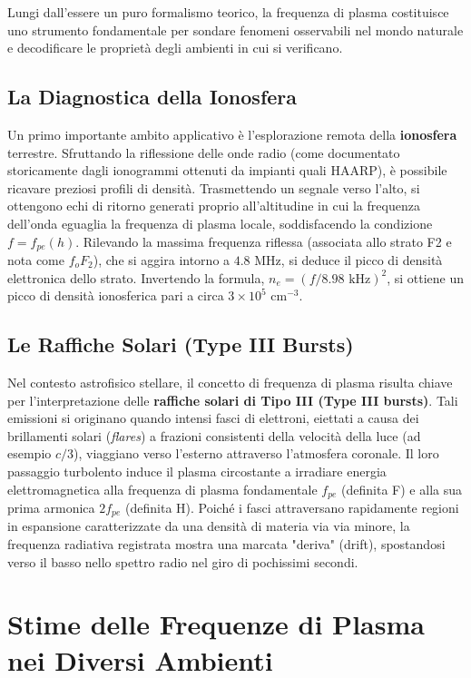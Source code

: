 Lungi dall'essere un puro formalismo teorico, la frequenza di plasma costituisce uno strumento fondamentale per sondare fenomeni osservabili nel mondo naturale e decodificare le proprietà degli ambienti in cui si verificano.

\subsection{La Diagnostica della Ionosfera}
Un primo importante ambito applicativo è l'esplorazione remota della \textbf{ionosfera} terrestre. Sfruttando la riflessione delle onde radio (come documentato storicamente dagli ionogrammi ottenuti da impianti quali HAARP), è possibile ricavare preziosi profili di densità. Trasmettendo un segnale verso l'alto, si ottengono echi di ritorno generati proprio all'altitudine in cui la frequenza dell'onda eguaglia la frequenza di plasma locale, soddisfacendo la condizione $f = f_{pe}(h)$. Rilevando la massima frequenza riflessa (associata allo strato F2 e nota come $f_o F_2$), che si aggira intorno a $4.8 \text{ MHz}$, si deduce il picco di densità elettronica dello strato. Invertendo la formula, $n_e = (f / 8.98 \text{ kHz})^2$, si ottiene un picco di densità ionosferica pari a circa $3 \times 10^5 \text{ cm}^{-3}$.

\subsection{Le Raffiche Solari (Type III Bursts)}
Nel contesto astrofisico stellare, il concetto di frequenza di plasma risulta chiave per l'interpretazione delle \textbf{raffiche solari di Tipo III (Type III bursts)}. Tali emissioni si originano quando intensi fasci di elettroni, eiettati a causa dei brillamenti solari (\textit{flares}) a frazioni consistenti della velocità della luce (ad esempio $c/3$), viaggiano verso l'esterno attraverso l'atmosfera coronale. Il loro passaggio turbolento induce il plasma circostante a irradiare energia elettromagnetica alla frequenza di plasma fondamentale $f_{pe}$ (definita F) e alla sua prima armonica $2f_{pe}$ (definita H). Poiché i fasci attraversano rapidamente regioni in espansione caratterizzate da una densità di materia via via minore, la frequenza radiativa registrata mostra una marcata "deriva" (drift), spostandosi verso il basso nello spettro radio nel giro di pochissimi secondi.

\section{Stime delle Frequenze di Plasma nei Diversi Ambienti}

